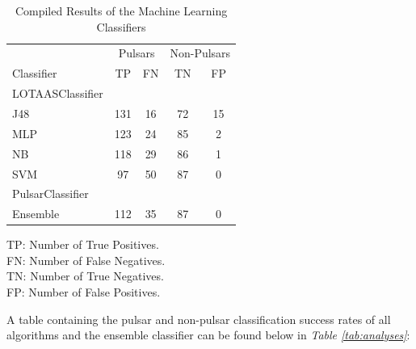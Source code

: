 \documentclass{article}
\begin{document}
\begin{table}[H]
    \centering
    
    \caption{Compiled Results of the Machine Learning Classifiers}

    \begin{framed}
        \begin{tabular}{l c c c c}
            & \multicolumn{2}{c}{Pulsars} & \multicolumn{2}{c}{Non-Pulsars} \\
            Classifier & TP & FN & TN & FP \\
            \hline
            \hline
            LOTAASClassifier &  &  & \\
            \hline
            J48 & 131 & 16 & 72 & 15 \\
            MLP & 123 & 24 & 85 & 2 \\
            NB & 118 & 29 & 86 & 1 \\
            SVM & 97 & 50 & 87 & 0 \\
            \hline
            PulsarClassifier &  &  & \\
            \hline
            Ensemble & 112 & 35 & 87 & 0 \\
            \hline
            \hline
        \end{tabular}

        \vspace{8px}
        TP: Number of True Positives.\\
        FN: Number of False Negatives.\\
        TN: Number of True Negatives.\\
        FP: Number of False Positives. \\
    \end{framed}
    \label{tab:compiled}
\end{table}

A table containing the pulsar and non-pulsar classification success rates of all algorithms and the ensemble classifier can be found below in \emph{Table \ref{tab:analyses}}:
\end{document}

